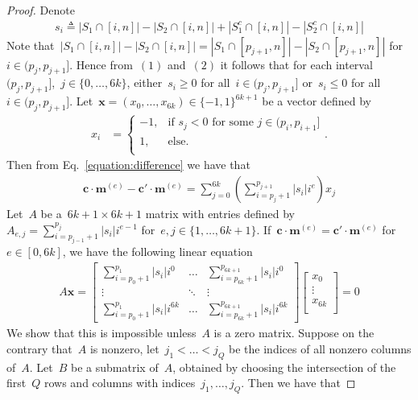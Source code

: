 \documentclass[10pt,a4paper,onecolumn]{IEEEtran}
\newcommand{\1}{\mathbbold{1}}
\newcommand{\boldc}{\mathbf{c}}
\newcommand{\boldm}{\mathbf{m}}
\newcommand{\boldx}{\mathbf{x}}
\begin{document}
\begin{proof}
Denote
\begin{align*}
s_i\triangleq |S_1\cap[i,n]|-|S_2\cap[i,n]|+|S^c_1\cap[i,n]|-|S^c_2\cap[i,n]|
\end{align*}
Note that~$|S_1\cap[i,n]|-|S_2\cap[i,n]|=|S_1\cap[p_{j+1},n]|-|S_2\cap[p_{j+1},n]|$ for~$i\in (p_j,p_{j+1}]$.
Hence from~$(1)$ and~$(2)$ it follows that for each interval~$(p_j,p_{j+1}]$,~$j\in\{0,\ldots,6k\}$, either~$s_i\ge 0$ for all~$i\in (p_j,p_{j+1}]$ or~$s_i\le 0$ for all~$i\in (p_j,p_{j+1}]$. 
Let~$\boldx=(x_0,\ldots,x_{6k})\in \{-1,1\}^{6k+1}$ be a vector defined by
\begin{align*}
x_i &= \begin{cases}
-1, &\text{if~$s_j<0$ for some~$j\in (p_i,p_{i+1}]$}\\
1,&\text{else.}\\
\end{cases}.
\end{align*}
Then from Eq.~\eqref{equation:difference} we have that
\begin{align}\label{equation:linearequation}
    \boldc \cdot \boldm^{(e)}- \boldc' \cdot  \boldm^{(e)}= \sum^{6k}_{j=0}(\sum^{p_{j+1}}_{i=p_{j}+1}|s_i|i^e)x_j
\end{align}
Let~$A$ be a~$6k+1\times 6k+1$ matrix with entries defined by~$A_{e,j}=\sum^{p_{j}}_{i=p_{j-1}+1}|s_i|i^{e-1}$ for~$e,j\in\{1,\ldots,6k+1\}$.
If~$\boldc \cdot \boldm^{(e)}= \boldc' \cdot  \boldm^{(e)}$ for~$e\in [0,6k]$, we have the following linear equation
\begin{align}\label{equation:linear}
A\boldsymbol{x}=\begin{bmatrix}
\sum^{p_{1}}_{i=p_{0}+1}|s_i|i^0 &\ldots & \sum^{p_{6k+1}}_{i=p_{6k}+1}|s_i|i^0\\
\vdots &\ddots & \vdots\\
\sum^{p_{1}}_{i=p_{0}+1}|s_i|i^{6k} &\ldots & \sum^{p_{6k+1}}_{i=p_{6k}+1}|s_i|i^{6k}
\end{bmatrix}
\begin{bmatrix}
x_0\\
\vdots\\
x_{6k}\\
\end{bmatrix}
=0
\end{align}
We show that this is impossible unless~$A$ is a zero matrix. Suppose on the contrary that~$A$ is nonzero, let~$j_1<\ldots <j_Q$ be the indices of all nonzero columns of~$A$. Let~$B$ be a submatrix of~$A$, obtained by choosing the intersection of the first~$Q$ rows and columns with indices~$j_1,\ldots,j_Q$. Then we have that

\end{proof}
\end{document}
